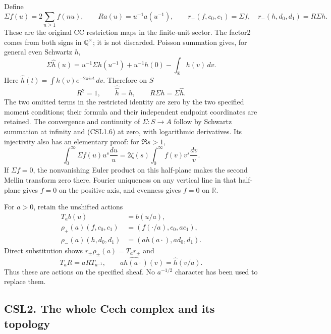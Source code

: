 Define \[
\Sigma f(u)=2\sum_{n\ge1}f(nu),\qquad
Ra(u)=u^{-1}a(u^{-1}),\qquad
r_+(f,c_0,c_1)=\Sigma f,\quad r_-(h,d_0,d_1)=R\Sigma h.
\tag{CSL1.5}
\] These are the original CC restriction maps in the finite-unit sector.
The factor2 comes from both signs in \(\mathbb Q^\times\); it is not
discarded. Poisson summation gives, for general even Schwartz \(h\), \[
\Sigma\widehat h(u)
=u^{-1}\Sigma h(u^{-1})+u^{-1}h(0)-\int_{\mathbb R}h(v)\,dv.
\tag{CSL1.6}
\] Here \(\widehat h(t)=\int h(v)e^{-2\pi ivt}\,dv\). Therefore on \(S\)
\[
R^2=1,\qquad \widehat{\widehat h}=h,\qquad
R\Sigma h=\Sigma\widehat h.
\tag{CSL1.7}
\] The two omitted terms in the restricted identity are zero by the two
specified moment conditions; their formula and their independent
endpoint coordinates are retained. The convergence and continuity of
\(\Sigma:S\to A\) follow by Schwartz summation at infinity and (CSL1.6)
at zero, with logarithmic derivatives. Its injectivity also has an
elementary proof: for \(\Re s>1\), \[
\int_0^\infty\Sigma f(u)u^s\frac{du}{u}
=2\zeta(s)\int_0^\infty f(v)v^s\frac{dv}{v}.
\tag{CSL1.8}
\] If \(\Sigma f=0\), the nonvanishing Euler product on this half-plane
makes the second Mellin transform zero there. Fourier uniqueness on any
vertical line in that half-plane gives \(f=0\) on the positive axis, and
evenness gives \(f=0\) on \(\mathbb R\).

For \(a>0\), retain the unshifted actions \[
\begin{aligned}
T_a b(u)&=b(u/a),\\
\rho_+(a)(f,c_0,c_1)&=(f(\cdot/a),c_0,ac_1),\\
\rho_-(a)(h,d_0,d_1)&=(a h(a\cdot),ad_0,d_1).
\end{aligned}
\tag{CSL1.9}
\] Direct substitution shows \(r_\pm\rho_\pm(a)=T_a r_\pm\) and \[
T_aR=aRT_{a^{-1}},\qquad
\widehat{a h(a\cdot)}(v)=\widehat h(v/a).
\tag{CSL1.10}
\] Thus these are actions on the specified sheaf. No \(a^{-1/2}\)
character has been used to replace them.

\subsection{CSL2. The whole Cech complex and its
topology}\label{csl2.-the-whole-cech-complex-and-its-topology}


